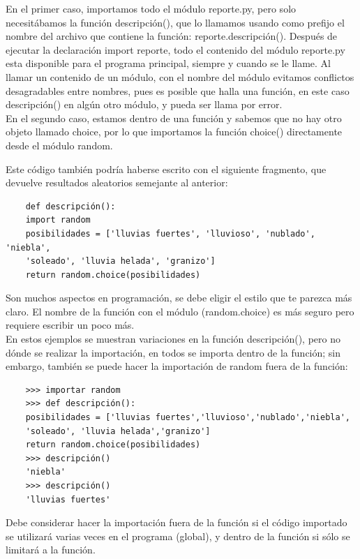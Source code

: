 En el primer caso, importamos todo el módulo {\ttfamily reporte.py}, pero solo necesitábamos la función {\ttfamily descripción()}, que lo llamamos usando como prefijo el nombre del archivo que contiene la función: {\ttfamily reporte.descripción()}. Después de ejecutar la declaración {\ttfamily import reporte}, todo el contenido del módulo {\ttfamily reporte.py} esta disponible para el programa principal, siempre y cuando se le llame. 
Al llamar un contenido de un módulo, con el nombre del módulo evitamos conflictos desagradables entre nombres, pues es posible que halla una función, en este caso  {\ttfamily descripción()} en algún otro módulo, y pueda ser llama por error.\\

En el segundo caso, estamos dentro de una función y sabemos que no hay otro objeto llamado {\ttfamily choice},
por lo que importamos la función  {\ttfamily choice()} directamente desde el módulo {\ttfamily random}. 

Este código también podría haberse escrito  con el siguiente fragmento, que devuelve resultados aleatorios semejante al anterior:

\begin{lstlisting}
	def descripción():
	import random
	posibilidades = ['lluvias fuertes', 'lluvioso', 'nublado', 'niebla',
	'soleado', 'lluvia helada', 'granizo']
	return random.choice(posibilidades) 
\end{lstlisting}

Son muchos aspectos en programación, se debe eligir el estilo que te parezca más claro. El nombre de la función con el módulo ({\ttfamily random.choice}) es más seguro pero requiere escribir un poco más.\\

En estos ejemplos se muestran variaciones en la función {\ttfamily descripción()}, pero no
dónde se realizar la importación,  en todos se importa dentro de la función; sin embargo, también 
se puede hacer la importación de {\ttfamily random} fuera de la función:

\begin{lstlisting}
	>>> importar random
	>>> def descripción():
	posibilidades = ['lluvias fuertes','lluvioso','nublado','niebla',
	'soleado', 'lluvia helada','granizo']
	return random.choice(posibilidades)
	>>> descripción()
	'niebla'
	>>> descripción()
	'lluvias fuertes'
\end{lstlisting}

Debe considerar hacer la importación fuera de la función si el código importado se  
utilizará varias veces en el programa (global), y dentro de la función si sólo se limitará  a la función.

